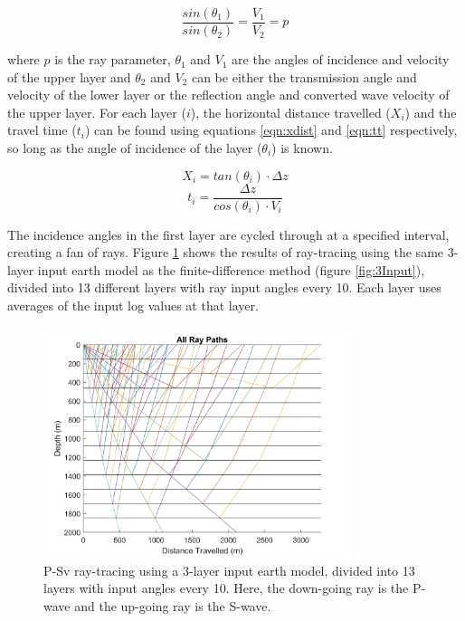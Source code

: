 \documentclass[12pt]{article}
\begin{document}
\begin{equation}
	\label{eqn:Snell}
	\frac{sin(\theta_1)}{sin(\theta_2)}=\frac{V_1}{V_2}=p
\end{equation}	
	
\noindent where $p$ is the ray parameter, $\theta_1$ and $V_1$ are the angles of incidence and velocity of the upper layer and $\theta_2$ and $V_2$ can be either the transmission angle and velocity of the lower layer or the reflection angle and converted wave velocity of the upper layer. For each layer ($i$), the horizontal distance travelled ($X_i$) and the travel time ($t_i$) can be found using equations \ref{eqn:xdist} and \ref{eqn:tt} respectively, so long as the angle of incidence of the layer ($\theta_i$) is known.
	

\begin{equation}
	\label{eqn:xdist}
	X_i=tan(\theta_i) \cdot \Delta z
\end{equation}
\begin{equation}
	\label{eqn:tt}
	t_i=\frac{\Delta z}{cos(\theta_i) \cdot V_i}
\end{equation}

	The incidence angles in the first layer are cycled through at a specified interval, creating a fan of rays. Figure \ref{fig:RT3AllPath} shows the results of ray-tracing using the same 3-layer input earth model as the finite-difference method (figure \ref{fig:3Input}), divided into 13 different layers with ray input angles every 10\degree. Each layer uses averages of the input log values at that layer. 
	
\begin{figure}[!htb]
	\centering
	\includegraphics[width=0.8\textwidth]{Figures/RT3AllRayPath.png}
	\caption[Ray-tracing 3-layer ray fan]{P-Sv ray-tracing using a 3-layer input earth model, divided into 13 layers with input angles every 10\degree. Here, the down-going ray is the P-wave and the up-going ray is the S-wave.}
	\label{fig:RT3AllPath}
\end{figure}
\end{document}
